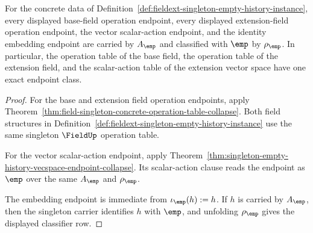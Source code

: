 \begin{theorem}
\label{thm:fieldext-singleton-exact-endpoint-classification}
For the concrete data of
Definition~\ref{def:fieldext-singleton-empty-history-instance}, every displayed
base-field operation endpoint, every displayed extension-field operation
endpoint, the vector scalar-action endpoint, and the identity embedding
endpoint are carried by $A_{\emp}$ and classified with $\emp$ by
$\rho_{\emp}$. In particular, the operation table of the base field, the
operation table of the extension field, and the scalar-action table of the
extension vector space have one exact endpoint class.
\end{theorem}
\begin{proof}
For the base and extension field operation endpoints, apply
Theorem~\ref{thm:field-singleton-concrete-operation-table-collapse}. Both
field structures in
Definition~\ref{def:fieldext-singleton-empty-history-instance} use the same
singleton $\FieldUp$ operation table.

For the vector scalar-action endpoint, apply
Theorem~\ref{thm:singleton-empty-history-vecspace-endpoint-collapse}. Its
scalar-action clause reads the endpoint as $\emp$ over the same
$A_{\emp}$ and $\rho_{\emp}$.

The embedding endpoint is immediate from $\iota_{\emp}(h):=h$. If $h$ is
carried by $A_{\emp}$, then the singleton carrier identifies $h$ with
$\emp$, and unfolding $\rho_{\emp}$ gives the displayed classifier row.
\end{proof}


